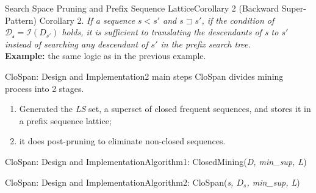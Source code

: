 \documentclass[12pt]{beamer}
\newcommand{\splitline}{\vspace{0.4cm}}
\begin{document}
\begin{frame}{Search Space Pruning and Prefix Sequence Lattice}{Corollary 2 (Backward Super-Pattern)}
Corollary 2. {\it If a sequence $s < s'$ and $s \sqsupset s'$, if the condition of $\mathcal{D_s} = \mathcal{I}(D_{s'})$ holds, it is sufficient to translating the descendants of s to $s'$ instead of searching any descendant of $s'$ in the prefix search tree.}\\
\splitline
{\bf Example:} the same logic as in the previous example.
\end{frame}

\begin{frame}{CloSpan: Design and Implementation}{2 main steps}
CloSpan divides mining process into 2 stages.
\begin{enumerate}
\item Generated the {\it LS} set, a superset of closed frequent sequences, and stores it in a prefix sequence lattice;
\item it does post-pruning to eliminate non-closed sequences.
\end{enumerate}
\end{frame}

\begin{frame}{CloSpan: Design and Implementation}{Algorithm1: ClosedMining({\it D, min\_sup, L})}
\begin{figure}
\end{figure}
\end{frame}

\begin{frame}{CloSpan: Design and Implementation}{Algorithm2: CloSpan({\it s, $D_s$, min\_sup, L})}
\begin{figure}
\end{figure}
\end{frame}
\end{document}
